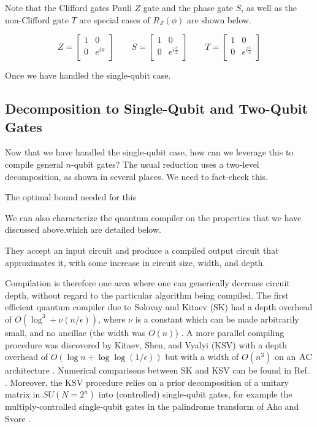 Note that the Clifford gates Pauli $Z$ gate and the phase gate $S$,
as well as the non-Clifford gate $T$ are special cases of $R_Z(\phi)$
are shown below.

\begin{equation}
Z =  \left[
  \begin{array}{cc}
    1 & 0 \\
    0 & e^{i\pi} \\
  \end{array} \right]
\qquad
S =  \left[
  \begin{array}{cc}
    1 & 0 \\
    0 & e^{i\frac{\pi}{2}} \\
  \end{array} \right]
\qquad
T =  \left[
  \begin{array}{cc}
    1 & 0 \\
    0 & e^{i\frac{\pi}{4}} \\
  \end{array} \right]
\end{equation}


Once we have handled the single-qubit case.

\subsection{Decomposition to Single-Qubit and Two-Qubit Gates}

Now that we have handled the single-qubit case, how can we leverage this
to compile general $n$-qubit gates? The usual reduction uses
a two-level decomposition, as shown in several places.
We need to fact-check this.
\cite{Kitaev2002}

The optimal bound needed for this 

We can
also characterize the quantum compiler on the properties that we
have discussed above.which are
detailed below.



They accept an input circuit and produce a compiled
output circuit that approximates it, with some increase in circuit size,
width, and depth.

Compilation is therefore
one area where one can generically decrease circuit depth, without
regard to the particular algorithm being compiled.
The first efficient quantum compiler due to
Solovay and Kitaev (SK) had a depth overhead of $O(\log^3+\nu(n/\epsilon))$,
where $\nu$ is a constant which can be made arbitrarily small, and no
ancillae (the width was $O(n)$) \cite{Dawson2005}.
A more parallel compiling procedure was discovered by Kitaev, Shen, and
Vyalyi (KSV) with a depth overhead of $O(\log n + \log\log(1/\epsilon))$ but
with a width of $O(n^3)$ on an $\textsc{AC}$ architecture \cite{Kitaev2002}.
Numerical comparisons between SK and KSV can be found in Ref. \cite{Pham2012a}.
Moreover, the KSV procedure relies on a prior decomposition of
a unitary matrix in $SU(N=2^n)$ into (controlled) single-qubit gates,
for example the multiply-controlled single-qubit gates in
the palindrome transform of Aho and Svore \cite{Aho2003}.

